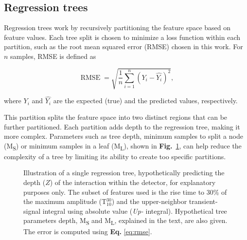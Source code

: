 \subsection{Regression trees}
Regression trees work by recursively partitioning the feature space based on feature values. Each tree split is chosen to minimize a loss function within each partition, such as the root mean squared error (RMSE) chosen in this work. For $n$ samples, RMSE is defined as 

\begin{equation}
\label{eq:rmse}
    \operatorname {RMSE} = \sqrt{\frac{1}{n}\sum _{i=1}^{n}\left(Y_{i}-{\hat {Y_{i}}}\right)^{2}},
\end{equation}

where $Y_{i}$ and $\hat {Y_{i}}$ are the expected (true) and the predicted values, respectively.


This partition splits the feature space into two distinct regions that can be further partitioned. Each partition adds depth to the regression tree, making it more complex. Parameters such as tree depth, minimum samples to split a node (M\textsubscript{S}) or minimum samples in a leaf (M\textsubscript{L}), shown in \textbf{Fig.}~\ref{fig:regression_tree}, can help reduce the complexity of a tree by limiting its ability to create too specific partitions. 

\begin{figure}
\centering
{}
\caption{Illustration of a single regression tree, hypothetically predicting the depth ($Z$) of the interaction within the detector, for explanatory purposes only. The subset of features used is the rise time to 30\% of the maximum amplitude (T$_{10}^{30}$) and the upper-neighbor transient-signal integral using absolute value (\textit{Up-} integral). Hypothetical tree parameters depth, M\textsubscript{S} and M\textsubscript{L}, explained in the text, are also given. The error is computed using \textbf{Eq.} \ref{eq:rmse}.}
\label{fig:regression_tree}
\end{figure}


